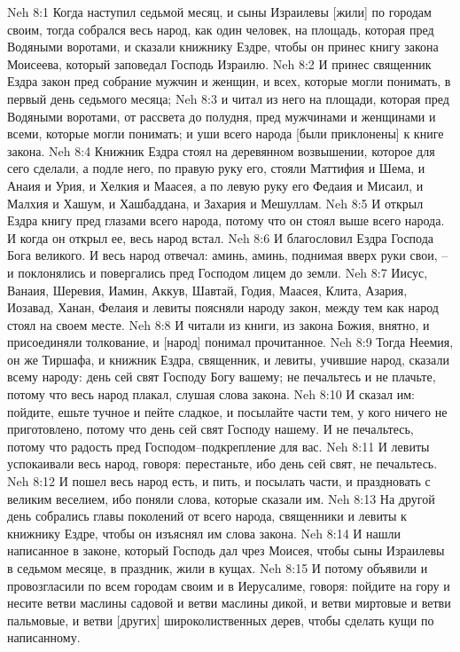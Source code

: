 Neh 8:1  Когда наступил седьмой месяц, и сыны Израилевы [жили] по городам своим, тогда собрался весь народ, как один человек, на площадь, которая пред Водяными воротами, и сказали книжнику Ездре, чтобы он принес книгу закона Моисеева, который заповедал Господь Израилю.
Neh 8:2  И принес священник Ездра закон пред собрание мужчин и женщин, и всех, которые могли понимать, в первый день седьмого месяца;
Neh 8:3  и читал из него на площади, которая пред Водяными воротами, от рассвета до полудня, пред мужчинами и женщинами и всеми, которые могли понимать; и уши всего народа [были приклонены] к книге закона.
Neh 8:4  Книжник Ездра стоял на деревянном возвышении, которое для сего сделали, а подле него, по правую руку его, стояли Маттифия и Шема, и Анаия и Урия, и Хелкия и Маасея, а по левую руку его Федаия и Мисаил, и Малхия и Хашум, и Хашбаддана, и Захария и Мешуллам.
Neh 8:5  И открыл Ездра книгу пред глазами всего народа, потому что он стоял выше всего народа. И когда он открыл ее, весь народ встал.
Neh 8:6  И благословил Ездра Господа Бога великого. И весь народ отвечал: аминь, аминь, поднимая вверх руки свои, --и поклонялись и повергались пред Господом лицем до земли.
Neh 8:7  Иисус, Ванаия, Шеревия, Иамин, Аккув, Шавтай, Годия, Маасея, Клита, Азария, Иозавад, Ханан, Фелаия и левиты поясняли народу закон, между тем как народ стоял на своем месте.
Neh 8:8  И читали из книги, из закона Божия, внятно, и присоединяли толкование, и [народ] понимал прочитанное.
Neh 8:9  Тогда Неемия, он же Тиршафа, и книжник Ездра, священник, и левиты, учившие народ, сказали всему народу: день сей свят Господу Богу вашему; не печальтесь и не плачьте, потому что весь народ плакал, слушая слова закона.
Neh 8:10  И сказал им: пойдите, ешьте тучное и пейте сладкое, и посылайте части тем, у кого ничего не приготовлено, потому что день сей свят Господу нашему. И не печальтесь, потому что радость пред Господом--подкрепление для вас.
Neh 8:11  И левиты успокаивали весь народ, говоря: перестаньте, ибо день сей свят, не печальтесь.
Neh 8:12  И пошел весь народ есть, и пить, и посылать части, и праздновать с великим веселием, ибо поняли слова, которые сказали им.
Neh 8:13  На другой день собрались главы поколений от всего народа, священники и левиты к книжнику Ездре, чтобы он изъяснял им слова закона.
Neh 8:14  И нашли написанное в законе, который Господь дал чрез Моисея, чтобы сыны Израилевы в седьмом месяце, в праздник, жили в кущах.
Neh 8:15  И потому объявили и провозгласили по всем городам своим и в Иерусалиме, говоря: пойдите на гору и несите ветви маслины садовой и ветви маслины дикой, и ветви миртовые и ветви пальмовые, и ветви [других] широколиственных дерев, чтобы сделать кущи по написанному.
